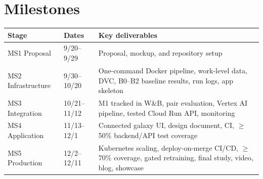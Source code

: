 \section*{Milestones}

{\tablestyle
\begin{xltabular}{\linewidth}{@{}L{2.6cm}L{1.9cm}Y@{}}
\toprule
\textbf{Stage} & \textbf{Dates} & \textbf{Key deliverables} \\
\midrule
MS1 Proposal & 9/20--9/29 & Proposal, mockup, and repository setup \\
MS2 Infrastructure & 9/30--10/20 & One-command Docker pipeline, work-level data, DVC, B0--B2 baseline results, run logs, app skeleton \\
MS3 Integration & 10/21--11/12 & M1 tracked in W\&B, pair evaluation, Vertex AI pipeline, tested Cloud Run API, monitoring \\
MS4 Application & 11/13--12/1 & Connected galaxy UI, design document, CI, $\geq$50\% backend/API test coverage \\
MS5 Production & 12/2--12/11 & Kubernetes scaling, deploy-on-merge CI/CD, $\geq$70\% coverage, gated retraining, final study, video, blog, showcase \\
\bottomrule
\end{xltabular}}
